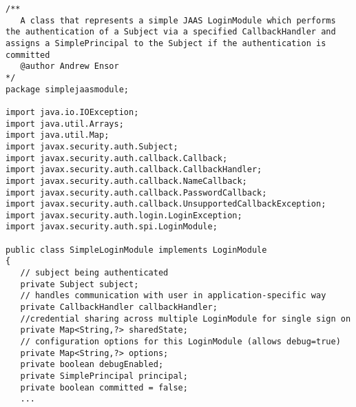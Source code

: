\begin{lstlisting}[caption=JAAS Login]
/**
   A class that represents a simple JAAS LoginModule which performs the authentication of a Subject via a specified CallbackHandler and assigns a SimplePrincipal to the Subject if the authentication is committed
   @author Andrew Ensor
*/
package simplejaasmodule;

import java.io.IOException;
import java.util.Arrays;
import java.util.Map;
import javax.security.auth.Subject;
import javax.security.auth.callback.Callback;
import javax.security.auth.callback.CallbackHandler;
import javax.security.auth.callback.NameCallback;
import javax.security.auth.callback.PasswordCallback;
import javax.security.auth.callback.UnsupportedCallbackException;
import javax.security.auth.login.LoginException;
import javax.security.auth.spi.LoginModule;

public class SimpleLoginModule implements LoginModule
{
   // subject being authenticated
   private Subject subject;
   // handles communication with user in application-specific way
   private CallbackHandler callbackHandler;
   //credential sharing across multiple LoginModule for single sign on
   private Map<String,?> sharedState;
   // configuration options for this LoginModule (allows debug=true)
   private Map<String,?> options;
   private boolean debugEnabled;
   private SimplePrincipal principal;
   private boolean committed = false;
   ...


\end{lstlisting}
